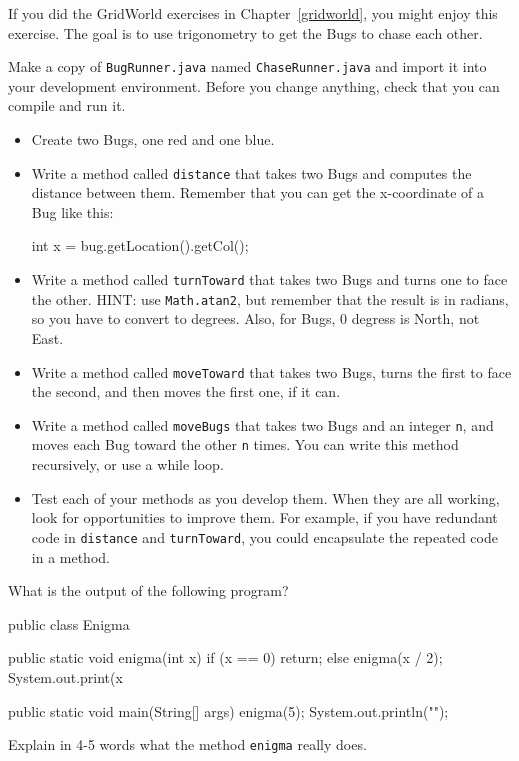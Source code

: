 \begin{exercise}
If you did the GridWorld exercises in Chapter~\ref{gridworld}, you
might enjoy this exercise.  The goal is to use trigonometry to get the
Bugs to chase each other.

Make a copy of {\tt BugRunner.java} named {\tt ChaseRunner.java} and
import it into your development environment.  Before you change
anything, check that you can compile and run it.

\begin{itemize}

\item Create two Bugs, one red and one blue.

\item Write a method called {\tt distance} that takes two Bugs
and computes the distance between them.  Remember that you can
get the x-coordinate of a Bug like this:

\begin{code}
    int x = bug.getLocation().getCol();
\end{code}

\item Write a method called {\tt turnToward} that takes two
Bugs and turns one to face the other.  HINT: use {\tt Math.atan2},
but remember that the result is in radians, so you have to
convert to degrees.  Also, for Bugs, 0 degress is North, not East.

\item Write a method called {\tt moveToward} that takes two
Bugs, turns the first to face the second, and then moves the
first one, if it can.

\item Write a method called {\tt moveBugs} that takes two Bugs
and an integer {\tt n}, and moves each Bug toward the other {\tt n}
times.  You can write this method recursively, or use a while loop.

\item Test each of your methods as you develop them.  When they are
  all working, look for opportunities to improve them.  For example,
  if you have redundant code in {\tt distance} and {\tt turnToward},
  you could encapsulate the repeated code in a method.

\end{itemize}
\end{exercise}


\begin{exercise}
What is the output of the following program?

\begin{code}
public class Enigma {

    public static void enigma(int x) {
        if (x == 0) {
            return;
        } else {
            enigma(x / 2);
        }
        System.out.print(x %
    }

    public static void main(String[] args) {
        enigma(5);
        System.out.println("");
    }
}
\end{code}

Explain in 4-5 words what the method {\tt enigma} really does.
\end{exercise}


